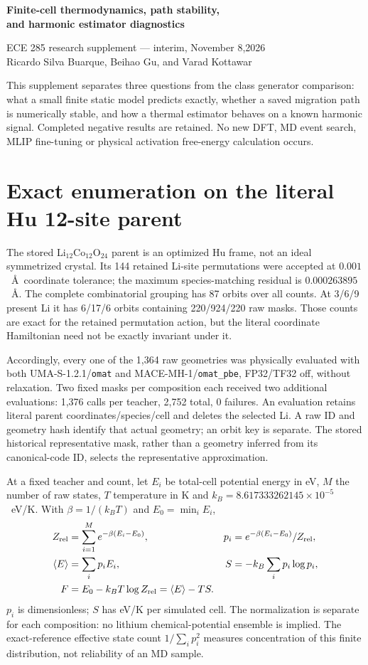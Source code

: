 \documentclass[10pt]{article}
\begin{document}
\begin{center}{\Large\bfseries Finite-cell thermodynamics, path stability,\\and harmonic estimator diagnostics}\par\vspace{5 pt}
ECE 285 research supplement --- interim, November 8,2026\\
Ricardo Silva Buarque, Beihao Gu, and Varad Kottawar
\end{center}
This supplement separates three questions from the class generator comparison:
what a small finite static model predicts exactly, whether a saved migration
path is numerically stable, and how a thermal estimator behaves on a known
harmonic signal. Completed negative results are retained. No new DFT, MD event
search, MLIP fine-tuning or physical activation free-energy calculation occurs.

\section{Exact enumeration on the literal Hu 12-site parent}
The stored Li$_{12}$Co$_{12}$O$_{24}$ parent is an optimized Hu frame, not an ideal
symmetrized crystal. Its 144 retained Li-site permutations were accepted at
$0.001$~\AA\ coordinate tolerance; the maximum species-matching residual is
$0.000263895$~\AA. The complete combinatorial grouping has 87 orbits over all
counts. At 3/6/9 present Li it has 6/17/6 orbits containing 220/924/220 raw masks.
Those counts are exact for the retained permutation action, but the literal
coordinate Hamiltonian need not be exactly invariant under it.

Accordingly, every one of the 1,364 raw geometries was physically evaluated with
both UMA-S-1.2.1/\texttt{omat} and MACE-MH-1/\texttt{omat\_pbe}, FP32/TF32 off,
without relaxation. Two fixed masks per composition each received two additional
evaluations: 1,376 calls per teacher, 2,752 total, 0 failures. An evaluation retains
literal parent coordinates/species/cell and deletes the selected Li. A raw ID
and geometry hash identify that actual geometry; an orbit key is separate.
The stored historical representative mask, rather than a geometry inferred from
its canonical-code ID, selects the representative approximation.

At a fixed teacher and count, let $E_i$ be total-cell potential energy in eV,
$M$ the number of raw states, $T$ temperature in K and
$k_B=8.617333262145\times 10^{-5}$~eV/K. With
$\beta=1/(k_BT)$ and $E_0=\min_iE_i$,
\begin{align}
Z_{\rm rel}&=\sum_{i=1}^M e^{-\beta(E_i-E_0)},&
p_i&=e^{-\beta(E_i-E_0)}/Z_{\rm rel},\\
\langle E\rangle&=\sum_i p_iE_i,&
S&=-k_B\sum_i p_i\log p_i,\\
F&=E_0-k_BT\log Z_{\rm rel}=\langle E\rangle-TS.
\end{align}
$p_i$ is dimensionless; $S$ has eV/K per simulated cell. The normalization is
separate for each composition: no lithium chemical-potential ensemble is implied.
The exact-reference effective state count $1/\sum_i p_i^2$ measures concentration
of this finite distribution, not reliability of an MD sample.
\end{document}

